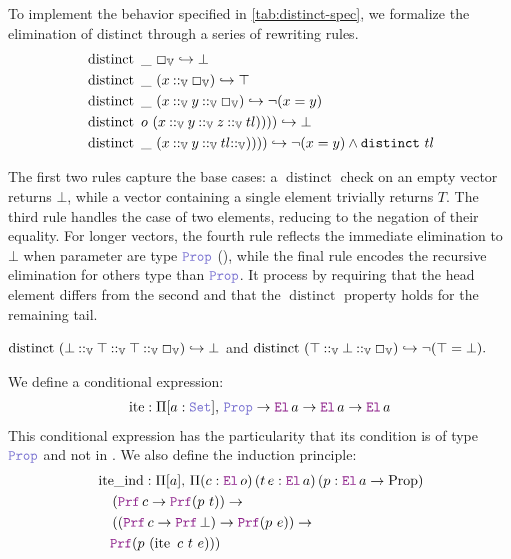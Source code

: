 \begin{definition}
To implement the behavior specified in \cref{tab:distinct-spec}, we formalize the elimination of distinct through a series of rewriting rules.
\begin{align*}
&\mathop{\mathrm{distinct}}~ \mathbin{\_}~\Box_\mathbb{V} \hookrightarrow \bot \\
&\mathop{\mathrm{distinct}}~\mathbin{\_}~ (x \mathbin{::}_\mathbb{V} \Box_\mathbb{V}) \hookrightarrow \top \\
&\mathop{\mathrm{distinct}}~\mathbin{\_}~ (x \mathbin{::}_\mathbb{V} y \mathbin{::}_\mathbb{V}  \Box_\mathbb{V}) \hookrightarrow \neg (x = y) \\
&\mathop{\mathrm{distinct}}~o~(x \mathbin{::}_\mathbb{V} y \mathbin{::}_\mathbb{V} z \mathbin{::}_\mathbb{V} tl)))) \hookrightarrow \bot \\
&\mathop{\mathrm{distinct}}~\_~(x \mathbin{::}_\mathbb{V} y \mathbin{::}_\mathbb{V} tl \mathbin{::}_\mathbb{V})))) \hookrightarrow \neg (x = y) \land \texttt{\upshape{distinct}}~tl
\end{align*}

The first two rules capture the base cases: a \(\mathop{\mathrm{distinct}}\) check on an empty vector returns $\bot$, while a vector containing a single element trivially returns $T$.
The third rule handles the case of two elements, reducing to the negation of their equality.
For longer vectors, the fourth rule reflects the immediate elimination to  $\bot$ when parameter are type $\prop$ (),
while the final rule encodes the recursive elimination for others type than $\prop$. It process by requiring that the head element differs from the second and that the 
\(\mathop{\mathrm{distinct}}\) property holds for the remaining tail.
\end{definition}

\begin{example}
\(
    \mathop{\mathrm{distinct}}~(\bot \mathbin{::}_\mathbb{V} \top \mathbin{::}_\mathbb{V} \top \mathbin{::}_\mathbb{V} \Box_\mathbb{V}) \hookrightarrow \bot
\)
and
\(
    \mathop{\mathrm{distinct}}~(\top \mathbin{::}_\mathbb{V} \bot \mathbin{::}_\mathbb{V} \Box_\mathbb{V}) \hookrightarrow \neg (\top = \bot).
\)
\end{example}

\begin{definition}
We define a conditional expression:
\begin{align*}
\mathop{\mathrm{ite}} : \Pi [a: \set],\, \prop \ra \el\,a \ra \el\,a \ra \el\,a
\end{align*}
This conditional expression has the particularity that its condition is of type $\prop$ and not in \B.
We also define the induction principle:
\begin{align*}
&\mathop{\mathrm{ite\_ind}} : \Pi [a],\, \Pi (c : \el\,o)\, (t\, e : \el\,a)\, (p : \el\,a \ra \mathrm{Prop})\\
&\quad\left( \prf\,c \ra \prf(p~t) \right) \ra \\
&\quad\left( (\prf\,c \ra \prf\,\bot) \ra \prf(p~e) \right) \ra \\
&\quad\prf(p~(\mathop{\mathrm{ite}}~c~t~e)))
\end{align*}
\end{definition}

